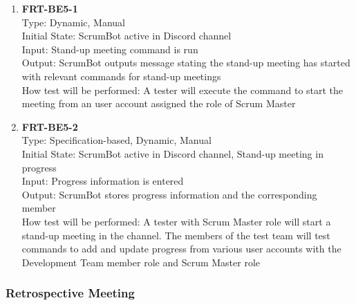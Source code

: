 \documentclass[12pt, titlepage]{article}
\begin{document}
\begin{enumerate}
    \item{\textbf{FRT-BE5-1}}\\
    Type: Dynamic, Manual\\
    Initial State: ScrumBot active in Discord channel\\
    Input: Stand-up meeting command is run\\
    Output: ScrumBot outputs message stating the stand-up meeting has started with relevant commands for stand-up meetings\\
    How test will be performed: A tester will execute the command to start the meeting from an user account assigned the role of Scrum Master\\
    
    \item{\textbf{FRT-BE5-2}}\\
    Type: Specification-based, Dynamic, Manual\\
    Initial State: ScrumBot active in Discord channel, Stand-up meeting in progress\\
    Input: Progress information is entered\\
    Output: ScrumBot stores progress information and the corresponding member\\
    How test will be performed: A tester with Scrum Master role will start a stand-up meeting in the channel. The members of the test team will test commands to add and update progress from various user accounts with the Development Team member role and Scrum Master role\\
\end{enumerate}

\subsubsection{Retrospective Meeting}
\end{document}
